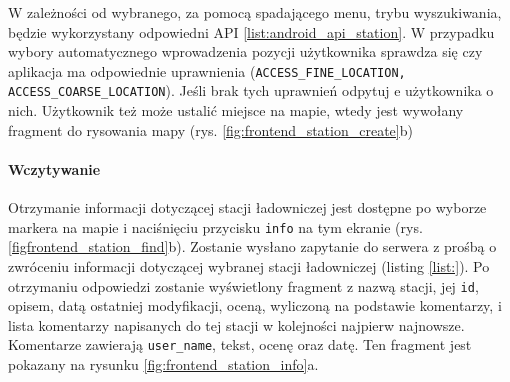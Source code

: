 W zależności od wybranego, za pomocą spadającego menu, trybu wyszukiwania, będzie wykorzystany odpowiedni API \ref{list:android_api_station}. W przypadku wybory automatycznego wprowadzenia pozycji użytkownika sprawdza się czy aplikacja ma odpowiednie uprawnienia (\texttt{ACCESS\_FINE\_LOCATION, ACCESS\_COARSE\_LOCATION}). Jeśli brak tych uprawnień odpytuj e użytkownika o nich.
Użytkownik też może ustalić miejsce na mapie, wtedy jest wywołany fragment do rysowania mapy (rys. \ref{fig:frontend_station_create}b)

\paragraph{Wczytywanie\newline}
Otrzymanie informacji dotyczącej stacji ładowniczej jest dostępne po wyborze markera na mapie i naciśnięciu przycisku \texttt{info} na tym ekranie (rys. \ref{figfrontend_station_find}b). Zostanie wysłano zapytanie do serwera z prośbą o zwróceniu informacji dotyczącej wybranej stacji ładowniczej (listing \ref{list:}). Po otrzymaniu odpowiedzi zostanie wyświetlony fragment z nazwą stacji, jej \texttt{id}, opisem, datą ostatniej modyfikacji, oceną, wyliczoną na podstawie komentarzy, i lista komentarzy napisanych do tej stacji w kolejności najpierw najnowsze.
Komentarze zawierają \texttt{user\_name}, tekst, ocenę oraz datę. Ten fragment jest pokazany na rysunku \ref{fig:frontend_station_info}a.
